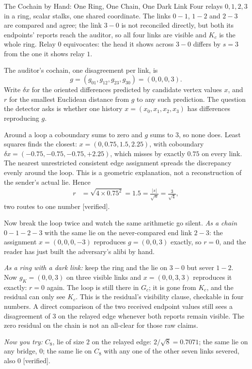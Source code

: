 \documentclass[11pt,a4paper]{article}
\theoremstyle{definition}
\theoremstyle{remark}
\begin{document}


\begin{pdexample}{The Cochain by Hand: One Ring, One Chain, One Dark Link}
\setlength{\parskip}{4pt plus 1pt}
Four relays $0,1,2,3$ in a ring, scalar stalks, one shared coordinate. The links
$0\!-\!1$, $1\!-\!2$ and $2\!-\!3$ are compared and agree; the link $3\!-\!0$ is
not reconciled directly, but both its endpoints' reports reach the auditor, so all four
links are visible and $K_c$ is the whole ring. Relay $0$ equivocates: the head
it shows across $3\!-\!0$ differs by $s=3$ from the one it shows relay $1$.

The
auditor's cochain, one disagreement per link, is
\[
g=(g_{01},g_{12},g_{23},g_{30})=(0,0,0,3).
\] Write $\delta x$ for the oriented differences predicted by candidate
vertex values $x$, and $r$ for the smallest Euclidean distance from $g$ to
any such prediction. The question the detector asks
is whether one history $x=(x_0,x_1,x_2,x_3)$ has differences reproducing $g$.

Around a loop a coboundary sums to zero and $g$ sums to $3$, so none does. Least
squares finds the closest: $x=(0,0.75,1.5,2.25)$, with coboundary
$\delta x=(-0.75,-0.75,-0.75,+2.25)$, which misses by exactly $0.75$ on every
link. The nearest unrestricted consistent edge assignment spreads the discrepancy
evenly around the loop. This is a geometric explanation, not a reconstruction
of the sender's actual lie. Hence
\[
\begin{aligned}
r&=\sqrt{4\times0.75^{2}}=1.5
  =\frac{|s|}{\sqrt n}=\frac{3}{\sqrt4},
\end{aligned}
\]
two routes to one number [verified].

Now break the loop twice and watch the
same arithmetic go silent. \emph{As a chain} $0\!-\!1\!-\!2\!-\!3$ with the same
lie on the never-compared end link $2\!-\!3$: the assignment $x=(0,0,0,-3)$
reproduces $g=(0,0,3)$ exactly, so $r=0$, and the reader has just built the
adversary's alibi by hand.

\emph{As a ring with a dark link:} keep the ring and
the lie on $3\!-\!0$ but sever $1\!-\!2$. Now $g_K=(0,0,3)$ on three visible
links and $x=(0,0,3,3)$ reproduces it exactly: $r=0$ again. The loop is still
there in $G_c$; it is gone from $K_c$, and the residual can only see $K_c$.
This is the residual's visibility clause, checkable in four numbers.
A direct comparison of the two received endpoint values still sees a
disagreement of $3$ on the relayed edge whenever both reports remain visible.
The zero residual on the chain is not an all-clear for those raw claims.

\emph{Now
you try:} $C_8$, lie of size $2$ on the relayed edge: $2/\sqrt8=0.7071$; the same
lie on any bridge, $0$; the same lie on $C_8$ with any one of the other seven
links severed, also $0$ [verified].
\end{pdexample}
\end{document}
